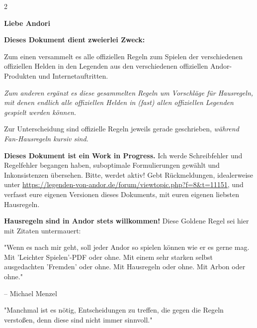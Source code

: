\documentclass[10pt, a4paper, oneside]{book}
\newcommand{\fan}[1]{\textit{#1}}
\begin{document}
\thispagestyle{plain}


\maketitle

\thispagestyle{plain}


\setcounter{page}{3} %






\begin{multicols*}{2}\raggedcolumns



\textbf{Liebe Andori}
\bigskip

\textbf{Dieses Dokument dient zweierlei Zweck:} 

Zum einen versammelt es alle offiziellen Regeln zum Spielen der verschiedenen offiziellen Helden in den Legenden aus den verschiedenen offiziellen Andor-Produkten und Internetauftritten.

\fan{Zum anderen ergänzt es diese gesammelten Regeln um Vorschläge für Hausregeln, mit denen endlich alle offiziellen Helden in (fast) allen offiziellen Legenden gespielt werden können.}

Zur Unterscheidung sind offizielle Regeln jeweils gerade geschrieben, \fan{während Fan-Hausregeln kursiv sind.}\bigskip


\textbf{Dieses Dokument ist ein Work in Progress.} Ich werde Schreibfehler und Regelfehler begangen haben, suboptimale Formulierungen gewählt und Inkonsistenzen übersehen. Bitte, werdet aktiv! Gebt Rückmeldungen, idealerweise unter \url{https://legenden-von-andor.de/forum/viewtopic.php?f=8&t=11151}, und verfasst eure eigenen Versionen dieses Dokuments, mit euren eigenen liebsten Hausregeln.
\bigskip

\textbf{Hausregeln sind in Andor stets willkommen!} Diese Goldene Regel sei hier mit Zitaten untermauert:

\bigskip

"Wenn es nach mir geht, soll jeder Andor so spielen können wie er es gerne mag. Mit 'Leichter Spielen'-PDF oder ohne. Mit einem sehr starken selbst ausgedachten 'Fremden' oder ohne. Mit Hausregeln oder ohne. Mit Arbon oder ohne." 

– Michael Menzel
\supercite{6390}

\bigskip

"Manchmal ist es nötig, Entscheidungen zu treffen, die gegen die Regeln verstoßen, denn diese sind nicht immer sinnvoll."


\end{multicols*}
\end{document}
